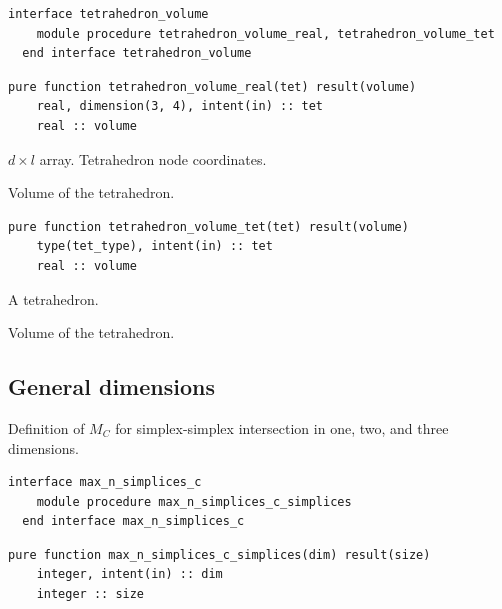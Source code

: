 \documentclass{article}
\begin{document}
\begin{lstlisting}[language=FORTRAN]
  interface tetrahedron_volume
    module procedure tetrahedron_volume_real, tetrahedron_volume_tet
  end interface tetrahedron_volume
\end{lstlisting}

\begin{lstlisting}[language=FORTRAN]
  pure function tetrahedron_volume_real(tet) result(volume)
    real, dimension(3, 4), intent(in) :: tet
    real :: volume
\end{lstlisting}

\begin{description}[font=\ttfamily\bfseries,leftmargin=2.2\parindent,labelindent=1.7\parindent,noitemsep]
  \item[tet] $d \times l$ array. Tetrahedron node coordinates.
  \item[volume] Volume of the tetrahedron.
\end{description}

\begin{lstlisting}[language=FORTRAN]
  pure function tetrahedron_volume_tet(tet) result(volume)
    type(tet_type), intent(in) :: tet
    real :: volume
\end{lstlisting}

\begin{description}[font=\ttfamily\bfseries,leftmargin=2.2\parindent,labelindent=1.7\parindent,noitemsep]
  \item[tet] A tetrahedron.
  \item[volume] Volume of the tetrahedron.
\end{description}

\subsection{General dimensions}\label{sect:nD_intersection}

Definition of $M_C$ for simplex-simplex intersection in one, two, and three
dimensions.

\begin{lstlisting}[language=FORTRAN]
  interface max_n_simplices_c
    module procedure max_n_simplices_c_simplices
  end interface max_n_simplices_c
\end{lstlisting}

\begin{lstlisting}[language=FORTRAN]
  pure function max_n_simplices_c_simplices(dim) result(size)
    integer, intent(in) :: dim
    integer :: size
\end{lstlisting}
\end{document}
